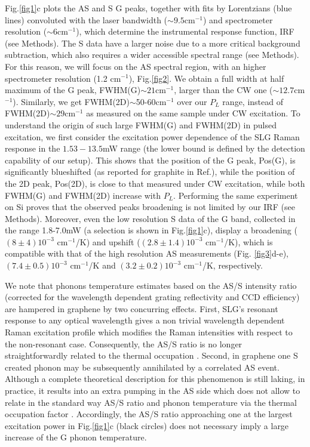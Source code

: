 \documentclass[aps, prl,twocolumn]{revtex4}
\begin{document}
Fig.\ref{fig1}c plots the AS and S G peaks, together with fits by Lorentzians (blue lines) convoluted with the laser bandwidth ($\sim9.5$cm$^{-1}$) and spectrometer resolution ($\sim6$cm$^{-1}$), which determine the instrumental response function, IRF (see Methods). The S data have a larger noise due to a more critical background subtraction, which also requires a wider accessible spectral range (see Methods). For this reason, we will focus on the AS spectral region, with an higher spectrometer resolution (1.2 cm$^{-1}$), Fig.\ref{fig2}. We obtain a full width at half maximum of the G peak, FWHM(G)$\sim21$cm$^{-1}$, larger than the CW one ($\sim 12.7$cm$^{-1}$). Similarly, we get FWHM(2D)$\sim$50-60cm$^{-1}$ over our $P_L$ range, instead of FWHM(2D)$\sim29$cm$^{-1}$ as measured on the same sample under CW excitation. To understand the origin of such large FWHM(G) and FWHM(2D) in pulsed excitation, we first consider the excitation power dependence of the SLG Raman response in the $1.53-13.5$mW range (the lower bound is defined by the detection capability of our setup). This shows that the position of the G peak, Pos(G), is significantly blueshifted (as reported for graphite in Ref.\cite{Yan2009}), while the position of the 2D peak, Pos(2D), is close to that measured under CW excitation, while both FWHM(G) and FWHM(2D) increase with $P_L$. Performing the same experiment on Si proves that the observed peaks broadening is not limited by our IRF (see Methods). Moreover, even the low resolution S data of the G band, collected in the range 1.8-7.0mW (a selection is shown in Fig.\ref{fig1}c), display a broadening ($(8\pm 4)10^{-3}$  cm$^{-1}$/K) and upshift ($(2.8\pm1.4)10^{-3}$  cm$^{-1}$/K), which is compatible with that of the high resolution AS measurements (Fig. \ref{fig3}d-e), $(7.4\pm0.5)10^{-3}$ cm$^{-1}$/K and $(3.2\pm0.2)10^{-3}$ cm$^{-1}$/K, respectively.

We note that phonons temperature estimates based on the AS/S intensity ratio\cite{Schomacker1986,FilhoPRB2001} (corrected for the wavelength dependent grating reflectivity and CCD efficiency) are hampered in graphene by two concurring effects. First, SLG's resonant response to any optical wavelength gives a non trivial wavelength dependent Raman excitation profile which modifies the Raman intensities with respect to the non-resonant case. Consequently, the AS/S ratio is no longer straightforwardly related to the thermal occupation \cite{goldstein2016raman}.
Second, in graphene one S created phonon may be subsequently annihilated by a correlated AS event. Although a complete theoretical description for this phenomenon is still laking, in practice, it results into an extra pumping in the AS side which does not allow to relate in the standard way AS/S ratio and phonon temperature via the thermal occupation factor \cite{ParraMurilloPRB2016}. Accordingly, the AS/S ratio approaching one at the largest excitation power in Fig.\ref{fig1}c (black circles) does not necessary imply a large increase of the G phonon temperature.
\end{document}
